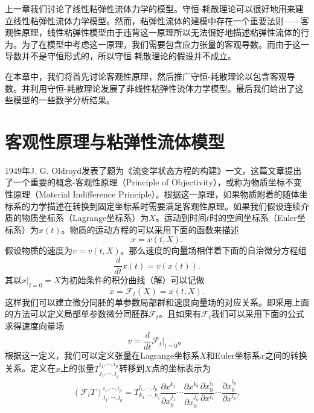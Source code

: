 \documentclass{article}
\begin{document}
上一章我们讨论了线性粘弹性流体力学的模型。守恒-耗散理论可以很好地用来建立线性粘弹性流体力学模型。然而，粘弹性流体的建模中存在一个重要法则——客观性原理，线性粘弹性模型由于违背这一原理所以无法很好地描述粘弹性流体的行为\cite{}。为了在模型中考虑这一原理，我们需要包含应力张量的客观导数。而由于这一导数并不是守恒形式的，所以守恒-耗散理论的假设并不成立。

在本章中，我们将首先讨论客观性原理，然后推广守恒-耗散理论以包含客观导数。并利用守恒-耗散理论发展了非线性粘弹性流体力学模型。最后我们给出了这些模型的一些数学分析结果。

\section{客观性原理与粘弹性流体模型}
1949年J. G. Oldroyd发表了题为《流变学状态方程的构建》一文\cite{}。这篇文章提出了一个重要的概念-客观性原理（Principle of Objectivity），或称为物质坐标不变性原理（Material Indifference Principle）。根据这一原理，如果物质附着的随体坐标系的力学描述在转换到固定坐标系时需要满足客观性原理。如果我们假设连续介质的物质坐标系（Lagrange坐标系）为$X$。运动到时间$t$时的空间坐标系（Euler坐标系）为$x(t)$。物质的运动方程的可以采用下面的函数来描述
\begin{equation*}
	x = x (t,X).
\end{equation*}
假设物质的速度为$v = v (t,X)$。那么速度的向量场相伴着下面的自治微分方程组
\begin{equation*}
	\frac{d}{dt} x(t) = v (x(t)).
\end{equation*}
其以$x|_{t=0}=X$为初始条件的积分曲线（解）可以记做
\begin{equation*}
	x = \mathcal{F}_t (X) = x (t,X).
\end{equation*}
这样我们可以建立微分同胚的单参数局部群和速度向量场的对应关系。即采用上面的方法可以定义局部单参数微分同胚群$\mathcal{F}_t$。且如果有$\mathcal{F}_t$我们可以采用下面的公式求得速度向量场
\begin{equation*}
	v = \frac{d}{dt} \mathcal{F}_t \big|_{t=0}。
\end{equation*}
根据这一定义，我们可以定义张量在Lagrange坐标系$X$和Euler坐标系$x$之间的转换关系。定义在$x$上的张量$T^{i_1,\cdots,i_p}_{j_1, \cdots,j_q}$转移到$X$点的坐标表示为
\begin{equation*}
	(\mathcal{F}_t T)^{i_1,\cdots,i_p}_{j_1, \cdots,j_q} = T^{l_1,\cdots,l_p}_{k_1, \cdots,k_q} \frac{\partial x^{k_1}}{\partial x_0^{j_1}} \cdots \frac{\partial x^{k_q}}{\partial x_0^{j_q}} \frac{\partial x_0^{i_1}}{\partial x^{l_1}} \cdots \frac{\partial x_0^{i_p}}{\partial x^{l_p}},  
\end{equation*}
\end{document}
